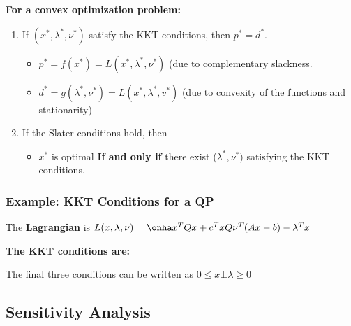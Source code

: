 \documentclass[8pt,a4paper]{scrartcl}
\begin{document}
\begin{multicols*}{3}
\finn

\textbf{For a convex optimization problem:}

\begin{enumerate}
\ncompaq
\item If $(x^\ast,\lambda^\ast,\nu^\ast)$ satisfy the KKT conditions, then $p^\ast=d^\ast$.
\begin{itemize}
\item $p^\ast=f(x^\ast)=L(x^\ast,\lambda^\ast,\nu^\ast)$ (due to complementary slackness.
\item $d^\ast=g(\lambda^\ast,\nu^\ast)=L(x^\ast,\lambda^\ast,v^\ast)$ (due to convexity of the functions and stationarity)
\end{itemize}
\item If the Slater conditions hold, then
\begin{itemize}
\item $x^\ast$ is optimal \textbf{If and only if} there exist ($\lambda^\ast,\nu^\ast)$ satisfying the KKT conditions.
\end{itemize}
\end{enumerate}

\subsubsection{Example: KKT Conditions for a QP}



The \textbf{Lagrangian} is $L(x,\lambda,\nu)=\onha x^TQx+c^TxQ\nu^T(Ax-b)-\lambda^Tx$

\finn

\textbf{The KKT conditions are:}


The final three conditions can be written as $0\leq x\bot\lambda\geq 0$

\subsection{Sensitivity Analysis}


\end{multicols*}
\end{document}
